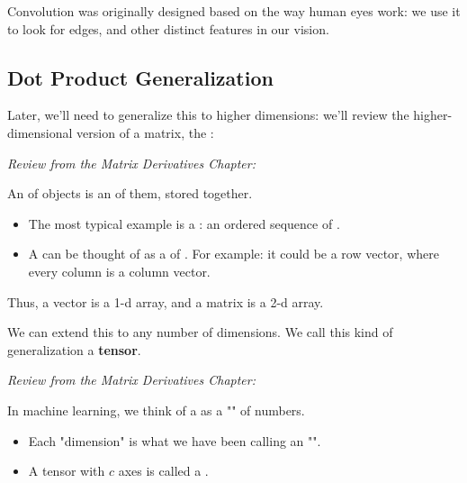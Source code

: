         \pagebreak

        \begin{remark*}
            Convolution was originally designed based on the way human eyes work: we use it to look for edges, and other distinct features in our vision.
        \end{remark*}
        
    \subsection{Dot Product Generalization}
        

        Later, we'll need to generalize this to higher dimensions: we'll review the higher-dimensional version of a matrix, the :\\

        \begin{definition}
            \textit{Review from the Matrix Derivatives Chapter:}
            
            An  of objects is an  of them, stored together. 

            \begin{itemize}
                \item The most typical example is a : an ordered sequence of .
            
                \item A  can be thought of as a  of . For example: it could be a row vector, where every column is a column vector. 
            \end{itemize}
                
            Thus, a vector is a 1-d array, and a matrix is a 2-d array.
            
        \end{definition}
        
        We can extend this to any number of dimensions. We call this kind of generalization a \textbf{tensor}.\\
        
        \begin{definition}
            \textit{Review from the Matrix Derivatives Chapter:}
            
            In machine learning, we think of a  as a "" of numbers.

            \begin{itemize}
                \item Each "dimension" is what we have been calling an "".
                
                \item A tensor with $c$ axes is called a .
            \end{itemize}
            
        \end{definition}

